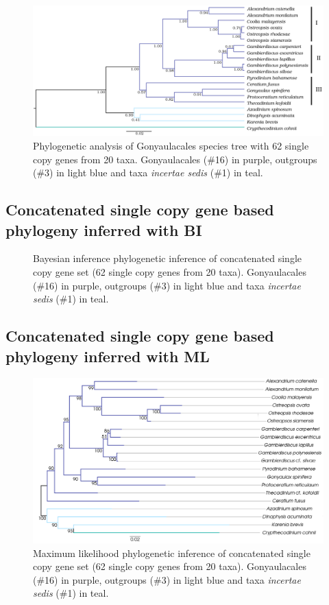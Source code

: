 \documentclass[12pt]{article}
\begin{document}
\begin{figure} 
\includegraphics[scale=.25]{Aug2_20-taxa-combined-fig_MCC_trees_gimp.png} 
\caption{Phylogenetic analysis of Gonyaulacales species tree with 62 single copy genes from 20 taxa. Gonyaulacales (\#16) in purple, outgroups (\#3) in light blue and taxa \textit{incertae sedis} (\#1) in teal.} 
\label{fig:SCmscBI}
\end{figure} 
\FloatBarrier

\subsection*{Concatenated single copy gene based phylogeny inferred with BI}
\FloatBarrier 
\begin{figure} 
\caption{Bayesian inference phylogenetic inference of concatenated single copy gene set (62 single copy genes from 20 taxa). Gonyaulacales (\#16) in purple, outgroups (\#3) in light blue and taxa \textit{incertae sedis} (\#1) in teal.} 
\label{fig:SCconcatBI}
\end{figure} 
\FloatBarrier

\subsection*{Concatenated single copy gene based phylogeny inferred with ML}
\FloatBarrier 
\begin{figure} 
\includegraphics[scale=.23]{figures/Singlecopy-concat-ML.png} 
\caption{Maximum likelihood phylogenetic inference of concatenated single copy gene set (62 single copy genes from 20 taxa). Gonyaulacales (\#16) in purple, outgroups (\#3) in light blue and taxa \textit{incertae sedis} (\#1) in teal.} 
\label{fig:SCconcatML}
\end{figure} 
\FloatBarrier
\end{document}
